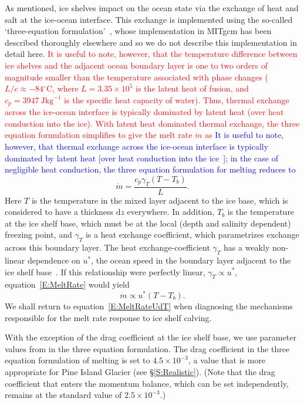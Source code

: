 \documentclass[draft]{agujournal2019}
\newcommand{\red}[1]{\textcolor{red}{#1}}
\newcommand{\blue}[1]{\textcolor{blue}{#1}}
\begin{document}
As mentioned, ice shelves impact on the ocean state via the exchange of heat and salt at the ice-ocean interface. This exchange is implemented using the so-called `three-equation formulation'~\cite{Holland1999JPhysOcean}, whose implementation in MITgcm has been described thoroughly elsewhere \cite[for example]{Losch2008JGeophysResOceans, DeRydt2014JGeophysResOceans,Dansereau2014JGROceans} and so we do not describe this implementation in detail here. \red{It is useful to note, however, that the temperature difference between ice shelves and the adjacent ocean boundary layer is one to two orders of magnitude smaller than the temperature associated with phase changes ($L/c \approx -84{}^\circ$C, where $L=3.35\times10^5$ is the latent heat of fusion, and $c_p=3947~\si{\joule \kilogram}^{-1}$ is the specific heat capacity of water). Thus, thermal exchange across the ice-ocean interface is typically dominated by latent heat (over heat conduction into the ice). With latent heat dominated thermal exchange, the three equation formulation simplifies to give the melt rate $\dot{m}$ as}
\blue{It is useful to note, however, that thermal exchange across the ice-ocean interface is typically dominated by latent heat [over heat conduction into the ice~\cite{Holland1999JPhysOcean}]; in the case of negligible heat conduction, the three equation formulation for melting reduces to}
\begin{equation}\label{E:MeltRate}
    \dot{m} = \frac{c_p \gamma_T (T - T_b)}{L}.
\end{equation}
Here $T$ is the temperature in the mixed layer adjacent to the ice base, which is considered to have a thickness $\mathrm{d}z$ everywhere. In addition, $T_b$ is the temperature at the ice shelf base, which must be at the local (depth and salinity dependent) freezing point, and $\gamma_T$ is a heat exchange coefficient, which parametrizes exchange across this boundary layer. The heat exchange-coefficient $\gamma_T$ has a weakly non-linear dependence on $u^*$, the ocean speed in the boundary layer adjacent to the ice shelf base~\cite{Holland1999JPhysOcean}. If this relationship were perfectly linear, $\gamma_T \propto u^*$, equation~\eqref{E:MeltRate} would yield
\begin{equation}\label{E:MeltRateUdT}
    \dot{m} \propto u^* (T - T_b).
\end{equation}
We shall return to equation~\eqref{E:MeltRateUdT} when diagnosing the mechanisms responsible for the melt rate response to ice shelf calving.

With the exception of the drag coefficient at the ice shelf base, we use parameter values from  in the three equation formulation. The drag coefficient in the three equation formulation of melting is set to $4.5\times10^{-3}$, a value that is more appropriate for Pine Island Glacier (see \S\ref{S:Realistic}). (Note that the drag coefficient that enters the momentum balance, which can be set independently, remains at the standard value of $2.5\times 10^{-3}$.)
\end{document}
